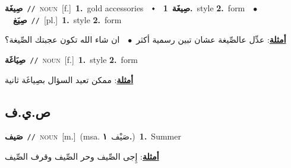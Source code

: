 \documentclass[10pt,a4paper,twoside]{article} %
\begin{document}
\begin{multicols}{2}
{\setlength\topsep{0pt}\textbf{\foreignlanguage{arabic}{صِيغَة}}\ {\color{gray}\texttt{//}\color{black}}\ \textsc{noun}\ [f.]\ \textbf{1.}~gold accessories\ \ $\smblkdiamond$\ \ \setlength\topsep{0pt}\textbf{\foreignlanguage{arabic}{صِيغَة}}\ \textbf{1.}~style  \textbf{2.}~form\ \ $\bullet$\ \ \setlength\topsep{0pt}\textbf{\foreignlanguage{arabic}{صِيَغ}}\ {\color{gray}\texttt{//}\color{black}}\ [pl.]\ \textbf{1.}~style  \textbf{2.}~form\  \begin{flushright}\color{gray}\foreignlanguage{arabic}{\textbf{\underline{\foreignlanguage{arabic}{أمثلة}}}: عدِّل عالصِّيغة عشان تبين رسمية أكثر\ $\bullet$\ \  ان شاء الله تكون عجبتك الصِّيغة؟}\end{flushright}\color{black}} \vspace{2mm}

{\setlength\topsep{0pt}\textbf{\foreignlanguage{arabic}{صِيَاغَة}}\ {\color{gray}\texttt{//}\color{black}}\ \textsc{noun}\ [f.]\ \textbf{1.}~style  \textbf{2.}~form\  \begin{flushright}\color{gray}\foreignlanguage{arabic}{\textbf{\underline{\foreignlanguage{arabic}{أمثلة}}}: ممكن تعيد السؤال بصِياغَة ثانية}\end{flushright}\color{black}} \vspace{2mm}

\vspace{-3mm}
\subsection*{\color{blue}\foreignlanguage{arabic}{ص.ي.ف}\color{blue}{}} 

{\setlength\topsep{0pt}\textbf{\foreignlanguage{arabic}{صَيف}}\ {\color{gray}\texttt{//}\color{black}}\ \textsc{noun}\ [m.]\ \color{gray}(msa. \foreignlanguage{arabic}{صَيْف}~\foreignlanguage{arabic}{\textbf{١.}})\color{black}\ \textbf{1.}~Summer\  \begin{flushright}\color{gray}\foreignlanguage{arabic}{\textbf{\underline{\foreignlanguage{arabic}{أمثلة}}}: إِجى الصِّيف وحر الصِّيف وقرف الصِّيف}\end{flushright}\color{black}} \vspace{2mm}


\end{multicols}
\end{document}

